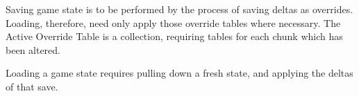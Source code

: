Saving game state is to be performed by the process of saving deltas as overrides. Loading, therefore, need only apply those override tables where necessary. The Active Override Table is a collection, requiring tables for each chunk which has been altered. 

Loading a game state requires pulling down a fresh state, and applying the deltas of that save.
